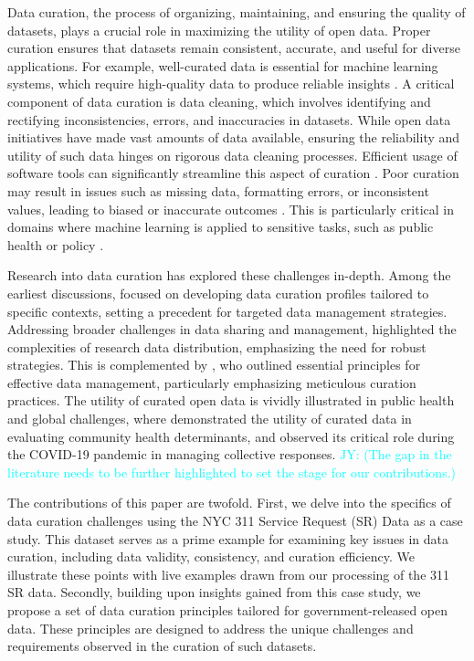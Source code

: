 \documentclass[linenumber]{jdsart}
\newcommand{\jy}[1]{\textcolor{cyan}{JY: (#1)}}
\begin{document}
Data curation, the process of organizing, maintaining, and ensuring
the quality of datasets, plays a crucial role in maximizing the
utility of open data. Proper curation ensures that datasets remain
consistent, accurate, and useful for diverse applications. For example, 
well\mbox{-}curated data is essential for machine learning systems, which 
require high\mbox{-}quality data to produce reliable insights 
\citep{polyzotis2019data, jain2020overview}. A critical component of 
data curation is data cleaning, which involves identifying and rectifying 
inconsistencies, errors, and inaccuracies in datasets. While open data 
initiatives have made vast amounts of data available, ensuring the 
reliability and utility of such data hinges on rigorous data cleaning processes. 
Efficient usage of software tools can significantly streamline this 
aspect of curation \citep[e.g.,][]{cody2017cody, van2018statistical}. Poor 
curation may result in issues such as missing data, formatting errors, 
or inconsistent values, leading to biased or inaccurate outcomes 
\citep{geiger2020garbage}. This is particularly critical in domains 
where machine learning is applied to sensitive tasks, such as public 
health or policy \citep{rahm2000data}.


Research into data curation has explored these challenges in\mbox{-}depth. 
Among the earliest discussions, \citet{witt2009constructing} focused 
on developing data curation profiles tailored to specific contexts, 
setting a precedent for targeted data management strategies. 
Addressing broader challenges in data sharing and management, 
\citet{borgman2012conundrum} highlighted the complexities of 
research data distribution, emphasizing the need for robust 
strategies. This is complemented by \citet{hart2016ten}, who outlined 
essential principles for effective data management, particularly 
emphasizing meticulous curation practices. The utility of curated 
open data is vividly illustrated in public health and global challenges, 
where \citet{cantor2018facets} demonstrated the utility of curated 
data in evaluating community health determinants, and 
\citet{shankar2021data} observed its critical role during the 
COVID-19 pandemic in managing collective responses.
\jy{The gap in the literature needs to be further highlighted to set 
  the stage for our contributions.}


The contributions of this paper are twofold. First, we delve into
the specifics of data curation challenges using the NYC 311 Service
Request (SR) Data as a case study. This dataset serves as a prime 
example for examining key issues in data curation, including data 
validity, consistency, and curation efficiency. We illustrate these 
points with live examples drawn from our 
processing of the 311 SR data. Secondly, building upon insights 
gained from this case study, we propose a set of data curation 
principles tailored for government-released open data. These 
principles are designed to address the unique challenges 
and requirements observed in the curation of such datasets.
\end{document}
